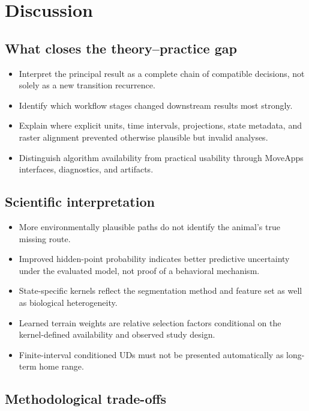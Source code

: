 \chapter{Discussion}
\label{chap:discussion}

\section{What closes the theory--practice gap}

\begin{itemize}
  \item Interpret the principal result as a complete chain of compatible decisions, not solely as a new transition recurrence.
  \item Identify which workflow stages changed downstream results most strongly.
  \item Explain where explicit units, time intervals, projections, state metadata, and raster alignment prevented otherwise plausible but invalid analyses.
  \item Distinguish algorithm availability from practical usability through MoveApps interfaces, diagnostics, and artifacts.
\end{itemize}

\section{Scientific interpretation}

\begin{itemize}
  \item More environmentally plausible paths do not identify the animal's true missing route.
  \item Improved hidden-point probability indicates better predictive uncertainty under the evaluated model, not proof of a behavioral mechanism.
  \item State-specific kernels reflect the segmentation method and feature set as well as biological heterogeneity.
  \item Learned terrain weights are relative selection factors conditional on the kernel-defined availability and observed study design.
  \item Finite-interval conditioned UDs must not be presented automatically as long-term home range.
\end{itemize}

\section{Methodological trade-offs}

